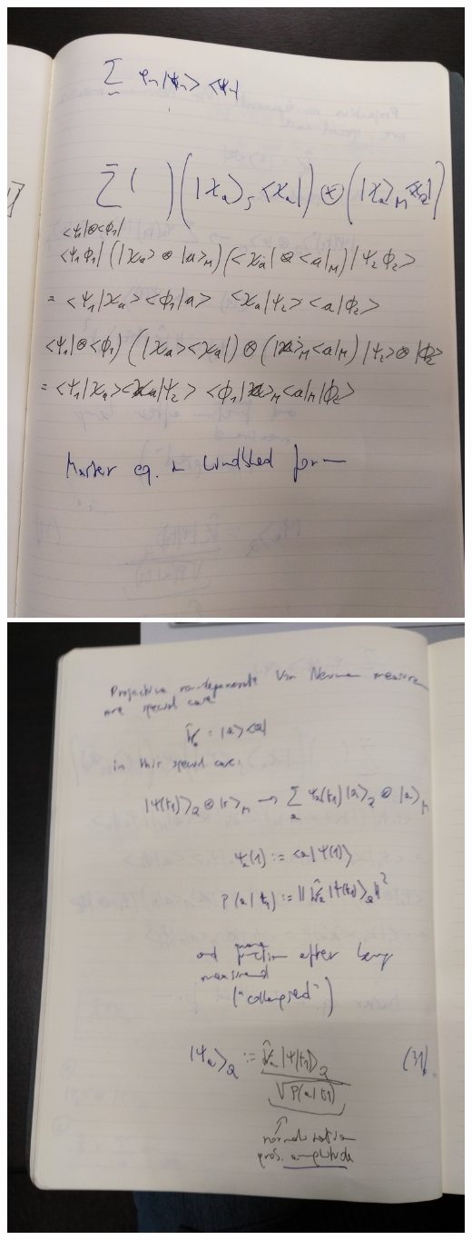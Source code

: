 \clearpage\includegraphics[width=\linewidth]{img/pw/qmem/3.jpg}
\clearpage\includegraphics[width=\linewidth]{img/pw/qmem/4.jpg}
